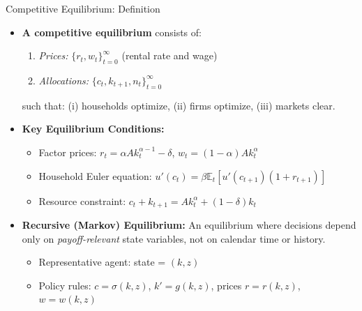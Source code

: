 \documentclass[10pt,english,aspectratio=169]{beamer}
\begin{document}
\begin{frame}{Competitive Equilibrium: Definition}
\begin{itemize}
\item \textbf{A competitive equilibrium} consists of:
\begin{enumerate}
    \item \emph{Prices:} $\{r_t, w_t\}_{t=0}^\infty$ (rental rate and wage)
    \item \emph{Allocations:} $\{c_t, k_{t+1}, n_t\}_{t=0}^\infty$
\end{enumerate}
such that: (i) households optimize, (ii) firms optimize, (iii) markets clear.

\medskip
\item \textbf{Key Equilibrium Conditions:}
\begin{itemize}
    \item Factor prices: $r_t = \alpha A k_t^{\alpha-1} - \delta$, \quad $w_t = (1-\alpha)A k_t^\alpha$
    \item Household Euler equation: $u'(c_t) = \beta \mathbb{E}_t[u'(c_{t+1})(1 + r_{t+1})]$
    \item Resource constraint: $c_t + k_{t+1} = A k_t^\alpha + (1-\delta)k_t$
\end{itemize}

\medskip
\item \textbf{Recursive (Markov) Equilibrium:} An equilibrium where decisions depend only on \emph{payoff-relevant} state variables, not on calendar time or history.
\begin{itemize}
    \item Representative agent: state = $(k, z)$
    \item Policy rules: $c = \sigma(k,z)$, $k' = g(k,z)$, prices $r = r(k,z)$, $w = w(k,z)$
\end{itemize}
\end{itemize}
\end{frame}
\end{document}
